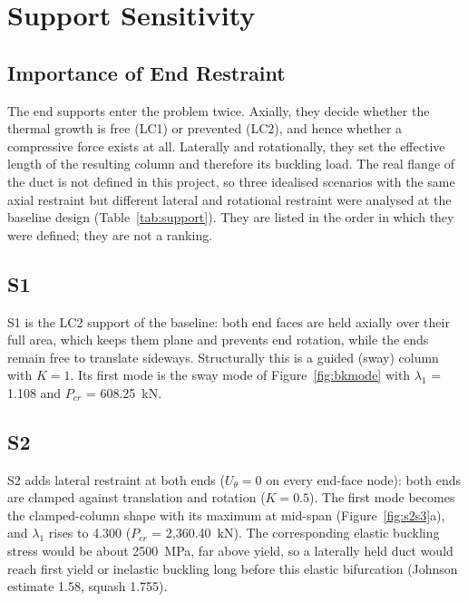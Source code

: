 \chapter{Support Sensitivity}\label{ch:supports}

\section{Importance of End Restraint}
The end supports enter the problem twice. Axially, they decide whether the thermal growth is free (LC1) or prevented (LC2), and hence whether
a compressive force exists at all. Laterally and rotationally, they set the effective length of the resulting column and therefore its
buckling load. The real flange of the duct is not defined in this project, so three idealised scenarios with the same axial
restraint but different lateral and rotational restraint were analysed at the baseline design (Table~\ref{tab:support}). They are listed
in the order in which they were defined; they are not a ranking.



\section{S1}
S1 is the LC2 support of the baseline: both end faces are held axially over their full area, which keeps them plane and prevents end rotation,
while the ends remain free to translate sideways. Structurally this is a guided (sway) column with $K = 1$. Its first mode is the sway mode of
Figure~\ref{fig:bkmode} with $\lambda_1$ = 1.108 and $P_{cr}$ = 608.25~kN.

\section{S2}
S2 adds lateral restraint at both ends ($U_\theta = 0$ on every end-face node): both ends are clamped against translation and rotation
($K = 0.5$). The first mode becomes the clamped-column shape with its maximum at mid-span (Figure~\ref{fig:s2s3}a), and $\lambda_1$ rises to
4.300 ($P_{cr}$ = 2,360.40~kN). The corresponding elastic buckling stress would be about 2500~MPa, far above yield, so a laterally held duct
would reach first yield or inelastic buckling long before this elastic bifurcation (Johnson estimate 1.58, squash 1.755).


